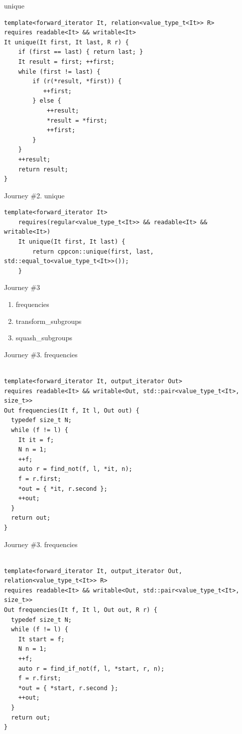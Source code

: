 \documentclass[10pt]{beamer}
\begin{document}
\begin{frame}[fragile]{unique}
\begin{lstlisting}[style=cpp]
template<forward_iterator It, relation<value_type_t<It>> R>
requires readable<It> && writable<It>
It unique(It first, It last, R r) {
    if (first == last) { return last; }
    It result = first; ++first;
    while (first != last) {
        if (r(*result, *first)) {
           ++first;
        } else {
            ++result;
            *result = *first;
            ++first;
        }
    }
    ++result;
    return result;
}

\end{lstlisting}
\end{frame}


\begin{frame}[fragile]{Journey \#2. unique}
    \begin{lstlisting}[style=cpp]
    template<forward_iterator It>
    requires(regular<value_type_t<It>> && readable<It> && writable<It>)
    It unique(It first, It last) {
        return cppcon::unique(first, last, std::equal_to<value_type_t<It>>());
    }
    \end{lstlisting}
\end{frame}

\begin{frame}{Journey \#3}
    \begin{enumerate}
        \item frequencies 
        \item transform\_subgroups
        \item squash\_subgroups
    \end{enumerate}
\end{frame}


\begin{frame}[fragile]{Journey \#3. frequencies}
\begin{lstlisting}[style=cpp]

template<forward_iterator It, output_iterator Out>
requires readable<It> && writable<Out, std::pair<value_type_t<It>, size_t>>
Out frequencies(It f, It l, Out out) {
  typedef size_t N;
  while (f != l) { 
    It it = f;
    N n = 1;
    ++f;
    auto r = find_not(f, l, *it, n);
    f = r.first;
    *out = { *it, r.second };
    ++out;
  } 
  return out;
}

\end{lstlisting}
\end{frame}


\begin{frame}[fragile]{Journey \#3. frequencies}
\begin{lstlisting}[style=cpp]

template<forward_iterator It, output_iterator Out, relation<value_type_t<It>> R>
requires readable<It> && writable<Out, std::pair<value_type_t<It>, size_t>>
Out frequencies(It f, It l, Out out, R r) {
  typedef size_t N;
  while (f != l) { 
    It start = f;
    N n = 1;
    ++f;
    auto r = find_if_not(f, l, *start, r, n);
    f = r.first;
    *out = { *start, r.second };
    ++out;
  } 
  return out;
}

\end{lstlisting}
\end{frame}
\end{document}
